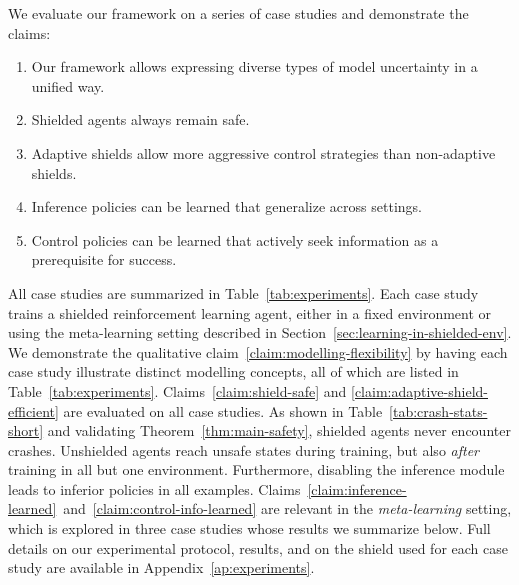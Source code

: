 \documentclass[acmsmall,screen,nonacm]{acmart}
\begin{document}
We evaluate our framework on a series of case studies and demonstrate the claims:

\begin{enumerate}[label=C\arabic*]
  \item \label{claim:modelling-flexibility} Our framework allows expressing diverse types of model uncertainty in a unified way.
  \item \label{claim:shield-safe} Shielded agents always remain safe.
  \item \label{claim:adaptive-shield-efficient} Adaptive shields allow more aggressive control strategies than non-adaptive shields.
  \item \label{claim:inference-learned} Inference policies can be learned that generalize across settings.
  \item \label{claim:control-info-learned} Control policies can be learned that actively seek information as a prerequisite for success.
\end{enumerate}

All case studies are summarized in Table~\ref{tab:experiments}. Each case study trains a shielded reinforcement learning agent, either in a fixed environment or using the meta-learning setting described in Section~\ref{sec:learning-in-shielded-env}. We demonstrate the qualitative claim~\ref{claim:modelling-flexibility} by having each case study illustrate distinct modelling concepts, all of which are listed in Table~\ref{tab:experiments}. Claims~\ref{claim:shield-safe} and \ref{claim:adaptive-shield-efficient} are evaluated on all case studies. As shown in Table~\ref{tab:crash-stats-short} and validating Theorem~\ref{thm:main-safety}, shielded agents never encounter crashes. Unshielded agents reach unsafe states during training, but also \emph{after} training in all but one environment. Furthermore, disabling the inference module leads to inferior policies in all examples. Claims~\ref{claim:inference-learned}~and~\ref{claim:control-info-learned} are relevant in the \emph{meta-learning} setting, which is explored in three case studies whose results we summarize below. Full details on our experimental protocol, results, and on the shield used for each case study are available in Appendix~\ref{ap:experiments}.
\end{document}
